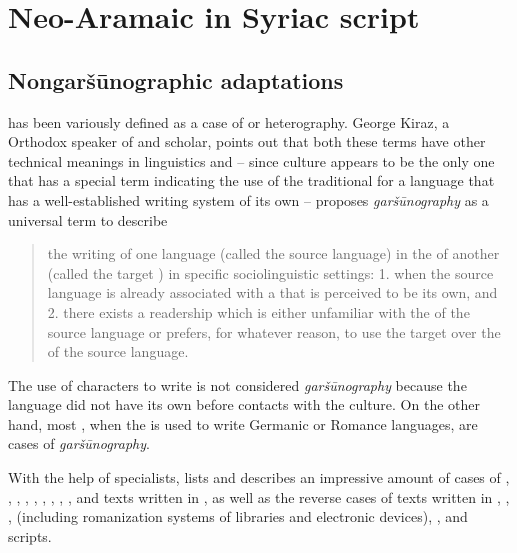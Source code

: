 \documentclass[output=paper,colorlinks,citecolor=brown,arabfont,syriacfont]{langscibook}
\begin{document}
\section{Neo-Aramaic in Syriac script}\label{ch.3.6.ss.3}

    \subsection{Nongaršūnographic adaptations}\label{ch.3.6.ss.3.1}

 has been variously defined as a case of  or heterography. George Kiraz, a  Orthodox speaker of  and  scholar, points out that both these terms have other technical meanings in  linguistics and -- since  culture appears to be the only one that has a special term indicating the use of the traditional  for a language that has a well-established writing system of its own -- proposes \textit{garšūnography} as a universal term to describe

\begin{quote}
the writing of one language (called the source language) in the  of another (called the target ) in specific sociolinguistic settings: 1. when the source language is already associated with a  that is perceived to be its own, and 2. there exists a readership which is either unfamiliar with the  of the source language or prefers, for whatever reason, to use the target  over the  of the source language. \citep[291]{kiraz2012}
\end{quote}

The use of  characters to write  is not considered \textit{garšūnography} because the language did not have its own  before contacts with the  culture. On the other hand, most , when the   is used to write Germanic or Romance languages, are cases of \textit{garšūnography}. 

With the help of specialists, \citet[291--351]{kiraz2012} lists and describes an impressive amount of cases of , , , , , , , , , and  texts written in  , as well as the reverse cases of  texts written in , , ,  (including romanization systems of libraries and electronic devices), , and  scripts. 
\end{document}
